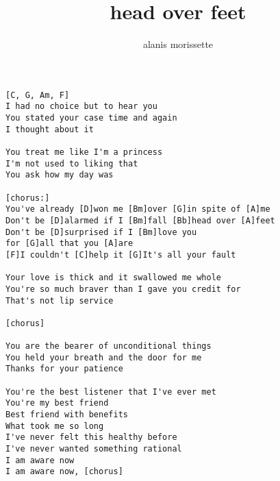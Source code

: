 \author{alanis morissette}
\title{head over feet}
\maketitle
\begin{verbatim}
[C, G, Am, F]
I had no choice but to hear you
You stated your case time and again
I thought about it

You treat me like I'm a princess
I'm not used to liking that
You ask how my day was

[chorus:]
You've already [D]won me [Bm]over [G]in spite of [A]me
Don't be [D]alarmed if I [Bm]fall [Bb]head over [A]feet
Don't be [D]surprised if I [Bm]love you
for [G]all that you [A]are
[F]I couldn't [C]help it [G]It's all your fault

Your love is thick and it swallowed me whole
You're so much braver than I gave you credit for
That's not lip service

[chorus]

You are the bearer of unconditional things
You held your breath and the door for me
Thanks for your patience

You're the best listener that I've ever met
You're my best friend
Best friend with benefits
What took me so long
I've never felt this healthy before
I've never wanted something rational
I am aware now
I am aware now, [chorus]
\end{verbatim}